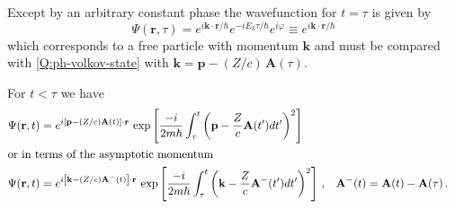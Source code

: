 Except by an arbitrary constant phase the wavefunction for $t=\tau$ is given by
\begin{equation*}
  \Psi(\bm{r},\tau) = e^{i \bm{k}\cdot\bm{r}/\hbar} e^{-i E_{k} \tau/\hbar} e^{i \varphi} \equiv e^{i \bm{k}\cdot\bm{r}/\hbar} 
\end{equation*}
which corresponds to a free particle with momentum $\bm{k}$ and must be compared with \eqref{Q:ph-volkov-state} with $ \bm{k}= \bm{p} - (Z/c)\,\bm{A}(\tau)$. 

For $t<\tau$ we have
\begin{align*}
  \Psi (\mathbf{r},t) &= e^{i \left[ \mathbf{p} - (Z/c)\mathbf{A}(t)\right]\cdot\mathbf{r}}\, \exp{\left[ \frac{-i}{2 m \hbar} \int_{\tau}^{t} \left( \mathbf{p} - \frac{Z}{c} \mathbf{A}(t') dt' \right)^{2}\right]} \\
\intertext{or in terms of the asymptotic momentum}
  \Psi (\mathbf{r},t) &= e^{i \left[\mathbf{k} - (Z/c)\mathbf{A}^{-}(t)\right]\cdot\mathbf{r}}\, \exp{\left[ \frac{-i}{2 m \hbar} \int_{\tau}^{t} \left( \mathbf{k} - \frac{Z}{c} \mathbf{A}^{-}(t') dt' \right)^{2}\right]}\ , &   \mathbf{A}^{-}(t)&=  \mathbf{A}(t) - \mathbf{A}(\tau) \,.
\end{align*}

